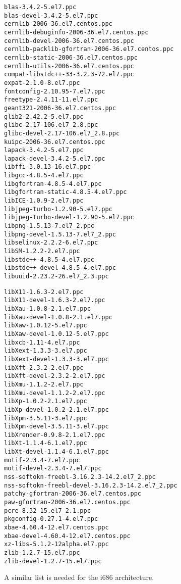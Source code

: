 \begin{minipage}{0.5\textwidth} 
\begin{Verbatim}[fontsize=\tiny]
blas-3.4.2-5.el7.ppc
blas-devel-3.4.2-5.el7.ppc
cernlib-2006-36.el7.centos.ppc
cernlib-debuginfo-2006-36.el7.centos.ppc
cernlib-devel-2006-36.el7.centos.ppc
cernlib-packlib-gfortran-2006-36.el7.centos.ppc
cernlib-static-2006-36.el7.centos.ppc
cernlib-utils-2006-36.el7.centos.ppc
compat-libstdc++-33-3.2.3-72.el7.ppc
expat-2.1.0-8.el7.ppc
fontconfig-2.10.95-7.el7.ppc
freetype-2.4.11-11.el7.ppc
geant321-2006-36.el7.centos.ppc
glib2-2.42.2-5.el7.ppc
glibc-2.17-106.el7_2.8.ppc
glibc-devel-2.17-106.el7_2.8.ppc
kuipc-2006-36.el7.centos.ppc
lapack-3.4.2-5.el7.ppc
lapack-devel-3.4.2-5.el7.ppc
libffi-3.0.13-16.el7.ppc
libgcc-4.8.5-4.el7.ppc
libgfortran-4.8.5-4.el7.ppc
libgfortran-static-4.8.5-4.el7.ppc
libICE-1.0.9-2.el7.ppc
libjpeg-turbo-1.2.90-5.el7.ppc
libjpeg-turbo-devel-1.2.90-5.el7.ppc
libpng-1.5.13-7.el7_2.ppc
libpng-devel-1.5.13-7.el7_2.ppc
libselinux-2.2.2-6.el7.ppc
libSM-1.2.2-2.el7.ppc
libstdc++-4.8.5-4.el7.ppc
libstdc++-devel-4.8.5-4.el7.ppc
libuuid-2.23.2-26.el7_2.3.ppc
\end{Verbatim}
\end{minipage}
\begin{minipage}{0.5\textwidth} 
\begin{Verbatim}[fontsize=\tiny]
libX11-1.6.3-2.el7.ppc
libX11-devel-1.6.3-2.el7.ppc
libXau-1.0.8-2.1.el7.ppc
libXau-devel-1.0.8-2.1.el7.ppc
libXaw-1.0.12-5.el7.ppc
libXaw-devel-1.0.12-5.el7.ppc
libxcb-1.11-4.el7.ppc
libXext-1.3.3-3.el7.ppc
libXext-devel-1.3.3-3.el7.ppc
libXft-2.3.2-2.el7.ppc
libXft-devel-2.3.2-2.el7.ppc
libXmu-1.1.2-2.el7.ppc
libXmu-devel-1.1.2-2.el7.ppc
libXp-1.0.2-2.1.el7.ppc
libXp-devel-1.0.2-2.1.el7.ppc
libXpm-3.5.11-3.el7.ppc
libXpm-devel-3.5.11-3.el7.ppc
libXrender-0.9.8-2.1.el7.ppc
libXt-1.1.4-6.1.el7.ppc
libXt-devel-1.1.4-6.1.el7.ppc
motif-2.3.4-7.el7.ppc
motif-devel-2.3.4-7.el7.ppc
nss-softokn-freebl-3.16.2.3-14.2.el7_2.ppc
nss-softokn-freebl-devel-3.16.2.3-14.2.el7_2.ppc
patchy-gfortran-2006-36.el7.centos.ppc
paw-gfortran-2006-36.el7.centos.ppc
pcre-8.32-15.el7_2.1.ppc
pkgconfig-0.27.1-4.el7.ppc
xbae-4.60.4-12.el7.centos.ppc
xbae-devel-4.60.4-12.el7.centos.ppc
xz-libs-5.1.2-12alpha.el7.ppc
zlib-1.2.7-15.el7.ppc
zlib-devel-1.2.7-15.el7.ppc
\end{Verbatim}
\end{minipage}

A similar list is needed for the i686 architecture.



